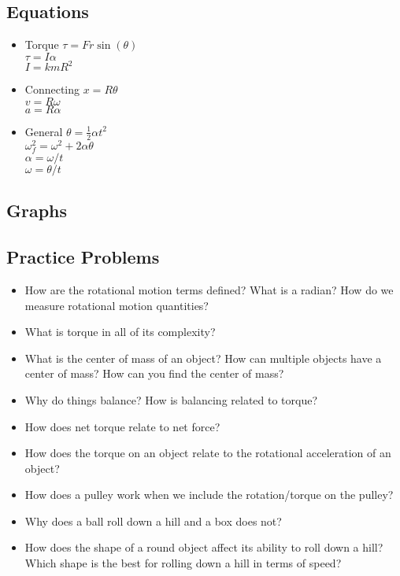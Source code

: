 \documentclass[11pt]{article}
\begin{document}
\subsection*{Equations}
\label{sec:org693fc35}
\begin{itemize}
\item Torque
\label{sec:org255e28e}
\(\tau=Fr\sin(\theta)\) \\
\(\tau=I\alpha\) \\
\(I=kmR^2\) \\
\item Connecting
\label{sec:org1932310}
\(x=R\theta\) \\
\(v=R\omega\) \\
\(a=R\alpha\) \\
\item General
\label{sec:org930f718}
\(\theta = \frac12 \alpha t^2\) \\
\(\omega_f^2=\omega^2 + 2\alpha \theta\) \\
\(\alpha = \omega / t\) \\
\(\omega = \theta /t\) \\
\end{itemize}
\subsection*{Graphs}
\label{sec:org64e473d}
\subsection*{Practice Problems}
\label{sec:org451f506}
\begin{itemize}
\item How are the rotational motion terms defined?  What is a radian?  How do we measure rotational motion quantities?
\item What is torque in all of its complexity?
\item What is the center of mass of an object?  How can multiple objects have a center of mass? How can you find the center of mass?
\item Why do things balance?  How is balancing related to torque?
\item How does net torque relate to net force?
\item How does the torque on an object relate to the rotational acceleration of an object?
\item How does a pulley work when we include the rotation/torque on the pulley?
\item Why does a ball roll down a hill and a box does not?
\item How does the shape of a round object affect its ability to roll down a hill?  Which shape is the best for rolling down a hill in terms of speed?
\end{itemize}
\end{document}

